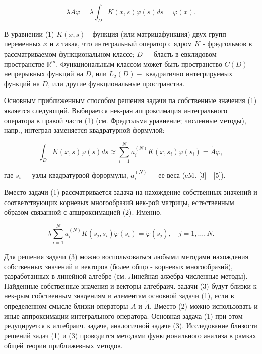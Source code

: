 \documentclass[10pt]{article}
\begin{document}
\[

\lambda A \varphi=\lambda \int_{D} K(x, s) \varphi(s) d s=\varphi(x) .

\]



В уравнении (1) $K(x, s)$ - функция (или матрицафункция) двух групп переменных $x$ и $s$ такая, что интегральный оператор с ядром $K$ - фредгольмов в рассматриваемом функциональном классе; $D-$-бласть в евклидовом пространстве $\mathbb{R}^{m}$. Функциональным классом может быть пространство $C(D)$ непрерывных функций на $D$, или $L_{2}(D)-$ квадратично интегрируемых функций на $D$, или другие функциональные пространства.



Основным приближенным способом решения задачи па собственные значения (1) является следующий. Выбирается нек-рая аппроксимация интегрального оператора в правой части (1) (см. Фредгольма уравнение; численные методы), напр., интеграл заменяется квадратурной формулой:



\[

\int_{D} K(x, s) \varphi(s) d s \approx \sum_{i=1}^{N} a_{i}^{(N)} K\left(x, s_{i}\right) \varphi\left(s_{i}\right)=\tilde{A} \varphi,

\]



где $s_{i}-$ узлы квадратурвой форормулы, $a_{i}^{(N)}-$ ее веса (cM. [3] - [5]).



Вместо задачи (1) рассматривается задача на нахождение собственных значений и соответствующих корневых многообразий нек-рой матрицы, естественным образом связанной с апшроксимацией (2). Именно,



\[

\lambda \sum_{i=1}^{N} a_{i}^{(N)} K\left(s_{j}, s_{i}\right) \tilde{\varphi}\left(s_{i}\right)=\tilde{\varphi}\left(s_{j}\right), \quad j=1, \ldots, N .

\]



Для решения задачи (3) можно воспользоваться любыми методами нахождения собственных значений и векторов (более общо - корневых многообразий), разработанных в линейной алгебре (см. Линейная аләебра численные методы). Найденные собственные значения и векторы алгебраич. задачи (3) будут близки к нек-рым собственным знаqениям и әлементам основной задачи (1), если в определенном смысле близки операторы $A$ и $\tilde{A}$. Вместо (2) можно использовать и иные аппроксимации интегрального оператора. Основная задача (1) при этом редуцируется к алгебраич. задаче, аналогичной задаче (3). Исследование близости решений задач (1) и (3) проводится методами функционального анализа в рамках общей теории приближевных методов.
\end{document}
